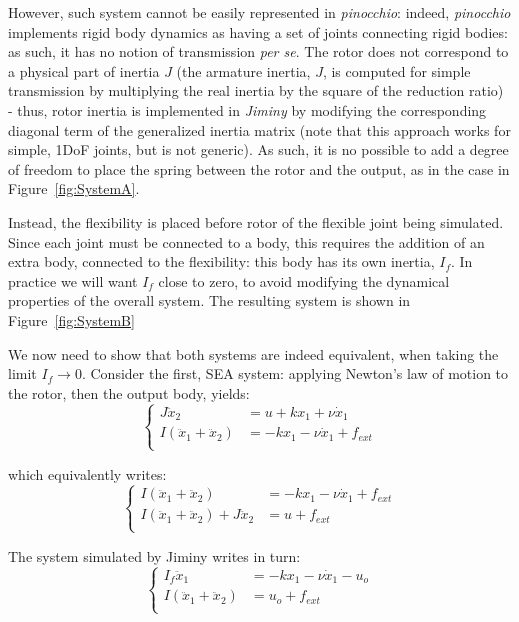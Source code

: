 \documentclass[a4paper,10pt]{article}
\begin{document}
However, such system cannot be easily represented in \emph{pinocchio}: indeed, \emph{pinocchio} implements rigid body dynamics as having a set of joints connecting rigid bodies: as such, it has no notion of transmission \emph{per se}. The rotor does not correspond to a physical part of inertia $J$ (the armature inertia, $J$, is computed for simple transmission by multiplying the real inertia by the square of the reduction ratio) - thus, rotor inertia is implemented in \emph{Jiminy} by modifying the corresponding diagonal term of the generalized inertia matrix (note that this approach works for simple, 1DoF joints, but is not generic). As such, it is no possible to add a degree of freedom to place the spring between the rotor and the output, as in the case in Figure~\ref{fig:SystemA}.

Instead, the flexibility is placed before rotor of the flexible joint being simulated. Since each joint must be connected to a body, this requires the addition of an extra body, connected to the flexibility: this body has its own inertia, $I_f$. In practice we will want $I_f$ close to zero, to avoid modifying the dynamical properties of the overall system. The resulting system is shown in Figure~\ref{fig:SystemB}

We now need to show that both systems are indeed equivalent, when taking the limit $I_f \rightarrow 0$. Consider the first, SEA system: applying Newton's law of motion to the rotor, then the output body, yields:
\begin{equation}
\left\{ 
\begin{aligned}
	J \ddot{x}_2 &= u + k x_1 + \nu \dot{x}_1 \\
	I (\ddot{x}_1 + \ddot{x}_2) &= -k x_1 -\nu \dot{x}_1 + f_{ext} \\
\end{aligned}
\right.
\end{equation}

which equivalently writes:
\begin{equation}
\left\{ 
\begin{aligned}
I (\ddot{x}_1 + \ddot{x}_2) &= -k x_1 -\nu \dot{x}_1 + f_{ext} \\
I (\ddot{x}_1 + \ddot{x}_2) + J \ddot{x}_2 &= u + f_{ext} \\
\end{aligned}
\right.
\label{eq:SystemA}
\end{equation}

The system simulated by Jiminy writes in turn:
\begin{equation}
\left\{ 
\begin{aligned}
I_f \ddot{x}_1 &= - k x_1 - \nu \dot{x}_1 - u_o\\
I (\ddot{x}_1 + \ddot{x}_2) &= u_o + f_{ext} \\
\end{aligned}
\right.
\label{eq:SystemB}
\end{equation}
 
\end{document}
